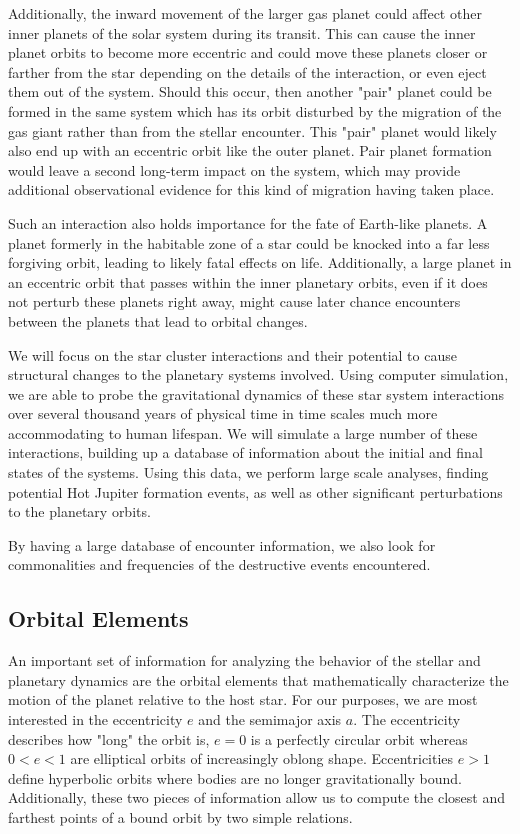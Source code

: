 \documentclass[12pt]{article}
\begin{document}
Additionally, the inward movement of the larger gas planet could affect other
inner planets of the solar system during its transit. This can
cause the inner planet orbits to become more eccentric and could move
these planets closer or farther from the star depending on the details of the
interaction, or even eject them out of the system. Should this occur,
then another "pair" planet could be formed in the same system which has its orbit
disturbed by the migration of the gas giant rather than from the stellar encounter. 
This "pair" planet 
would likely also end up with an eccentric orbit like the outer planet. Pair planet formation would leave
a second long-term impact on the system, which may provide additional observational
evidence for this kind of migration having taken place.

Such an interaction also holds importance for the fate of Earth-like planets.
A planet formerly in the habitable zone of a star could be knocked into a far less
forgiving orbit, leading to likely fatal effects on life. Additionally, a
large planet in an eccentric orbit that passes within the inner planetary orbits,
even if it does not perturb these planets right away, might cause later chance
encounters between the planets that lead to orbital changes.

We will focus on the star cluster interactions and their potential to 
cause structural changes to the planetary systems involved. Using computer simulation,
we are able to probe the gravitational dynamics of these star system 
interactions over several thousand years of physical time 
in time scales much more accommodating to human lifespan. We will simulate
a large number of these interactions, building up a database of information about
the initial and final states of the systems. Using this data, we perform large
scale analyses, finding potential Hot Jupiter formation events, as well as other
significant perturbations to the planetary orbits.

By having a large database of encounter information, we also look for commonalities
and frequencies of the destructive events encountered. 

\subsection{Orbital Elements}

    An important set of information for analyzing the behavior of the stellar and
    planetary dynamics are the orbital elements that mathematically 
    characterize the motion of the planet relative to the host star. 
    For our purposes, we are most interested in the eccentricity $e$ and the
    semimajor axis $a$. The eccentricity describes how "long" the orbit is, $e=0$
    is a perfectly circular orbit whereas $0<e<1$ are elliptical orbits of increasingly
    oblong shape. Eccentricities $e>1$ define hyperbolic orbits where bodies are no longer
    gravitationally bound. Additionally, these two pieces of information allow us to 
    compute the closest and farthest points of a bound orbit by two simple relations.
\end{document}
